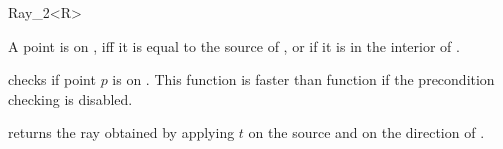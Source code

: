 \begin{ccRefClass}{Ray_2<R>}
       {}
\ccGlue
{}
       {}

       {A point is on \ccVar, iff it is equal to the source
        of \ccVar, or if it is in the interior of \ccVar.}

       {checks if point $p$ is on \ccVar. This function is faster
        than function  if the precondition 
	checking is disabled.
        }


       {returns the ray obtained by applying $t$ on the source
        and on the direction of \ccVar.}

\end{ccRefClass} 
